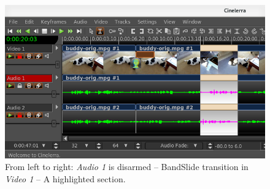 \begin{figure}[htpb]
	\centering
	\includegraphics[width=1.0\linewidth]{images/some_editing.png}
	\caption{From left to right:\textit{ Audio 1} is disarmed --  BandSlide transition in \textit{Video 1} -- A highlighted section.}	
\end{figure}


